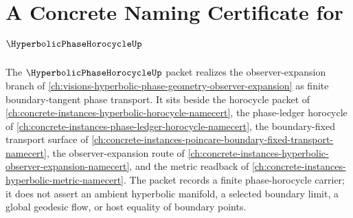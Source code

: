 \chapter{A Concrete Naming Certificate for $\HyperbolicPhaseHorocycleUp$}
\label{ch:concrete-instances-hyperbolic-phase-horocycle-namecert}

The $\HyperbolicPhaseHorocycleUp$ packet realizes the observer-expansion branch of \autoref{ch:visions-hyperbolic-phase-geometry-observer-expansion} as finite boundary-tangent phase transport. It sits beside the horocycle packet of \autoref{ch:concrete-instances-hyperbolic-horocycle-namecert}, the phase-ledger horocycle of \autoref{ch:concrete-instances-phase-ledger-horocycle-namecert}, the boundary-fixed transport surface of \autoref{ch:concrete-instances-poincare-boundary-fixed-transport-namecert}, the observer-expansion route of \autoref{ch:concrete-instances-hyperbolic-observer-expansion-namecert}, and the metric readback of \autoref{ch:concrete-instances-hyperbolic-metric-namecert}. The packet records a finite phase-horocycle carrier; it does not assert an ambient hyperbolic manifold, a selected boundary limit, a global geodesic flow, or host equality of boundary points.

